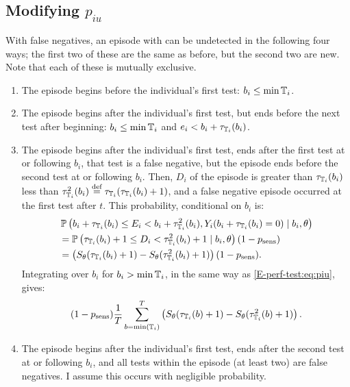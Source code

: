 \documentclass[thesis.tex]{subfiles}
\begin{document}
\subsection{Modifying \texorpdfstring{$p_{iu}$}{piu}} \label{imperf-test:sec:modifying-p_iu}

With false negatives, an episode with can be undetected in the following four ways; the first two of these are the same as before, but the second two are new.
Note that each of these is mutually exclusive.
\begin{enumerate}
\item
  The episode begins before the individual's first test: $b_i \leq \min \mathbb{T}_i$.
\item
  The episode begins after the individual's first test, but ends before the next test after beginning: $b_i \leq \min \mathbb{T}_i$ and $e_i < b_i + \tau_{\mathbb{T}_i}(b_i)$.
\item
  The episode begins after the individual's first test, ends after the first test at or following $b_i$, that test is a false negative, but the episode ends before the second test at or following $b_i$.
  Then, $D_i$ of the episode is greater than $\tau_{\mathbb{T}_i}(b_i)$ less than  $\tau^2_{\mathbb{T}_i}(b_i) \stackrel{\text{def}}{=} \tau_{\mathbb{T}_i}(\tau_{\mathbb{T}_i}(b_i) + 1)$, and a false negative episode occurred at the first test after $t$.
  This probability, conditional on $b_i$ is:
  \begin{align}
    &\operatorname{\mathbb{P}} \left( b_i + \tau_{\mathbb{T}_i}(b_i) \leq E_i < b_i + \tau^2_{\mathbb{T}_i}(b_i), Y_i(b_i + \tau_{\mathbb{T}_i}(b_i) = 0) \mid b_i, \theta \right) \\
    &= \operatorname{\mathbb{P}} \left(\tau_{\mathbb{T}_i}(b_i) + 1 \leq D_i < \tau^2_{\mathbb{T}_i}(b_i) + 1 \mid b_i, \theta \right) (1 - p_\text{sens}) \\
    &= \left( S_\theta(\tau_{\mathbb{T}_i}(b_i) + 1) - S_\theta(\tau^2_{\mathbb{T}_i}(b_i) + 1) \right) (1 - p_\text{sens}).
  \end{align}
  Integrating over $b_i$ for $b_i > \min \mathbb{T}_i$, in the same way as \cref{E-perf-test:eq:piu}, gives:
  \begin{align}
    (1 - p_\text{sens})\frac{1}{T} \sum_{b=\min(\mathbb{T}_i)}^T \left( S_\theta(\tau_{\mathbb{T}_i}(b) + 1) - S_\theta(\tau^2_{\mathbb{T}_i}(b) + 1) \right).
  \end{align}
\item
  The episode begins after the individual's first test, ends after the second test at or following $b_i$, and all tests within the episode (at least two) are false negatives.
  I assume this occurs with negligible probability.
\end{enumerate}
\end{document}

